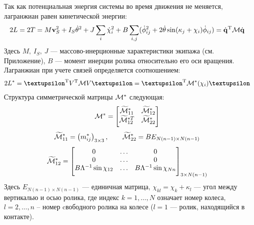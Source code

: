 Так как потенциальная энергия системы во время движения не меняется, лагранжиан  равен кинетической энергии:
\begin{equation}\label{kin_en}
    2L = 2T = M\boldsymbol{\mathbf{v}}_S^2 + I_S\dot{\theta}^2 + J\sum_i\dot{\chi}_i^2 + B\sum_{i,j}(\dot{\phi}_{ij}^2 + 2\dot{\theta}\sin(\kappa_j + \chi_i)\dot{\phi}_{ij})=\dot{\boldsymbol{\mathbf{q}}}^\mathrm{T}\mathcal{M}\dot{\boldsymbol{\mathbf{q}}}
\end{equation}
Здесь $M,\ I_S,\ J$ --- массово-инерционные характеристики экипажа (см. Приложение), $B$ --- момент инерции ролика относительно его оси вращения. Лагранжиан при учете связей определяется соотношением:
$$ 2L^{*}  = \vnu^\mathrm{T} V^\mathrm{T}\M V\vnu = \vnu^\mathrm{T} \M^*(\chi_i)\vnu $$
Структура симметрической матрицы $\mathcal{M}^*$ следующая:
$$
\M^* = 
    \begin{bmatrix}
        \widetilde{\M}^*_{11} & \widetilde{\M}^*_{12} \\
        \widetilde{\M}^{*T}_{12} & \widetilde{\M}^*_{22} \\[4pt]
    \end{bmatrix}
\vsp
$$
$$
\widetilde{\M}^*_{11} = 
    \left(
        m^*_{ij}
    \right)_{3\times3},
\qquad
\widetilde{\M}^*_{22} = 
    BE_{N(n-1) \times N(n-1)}
\vsp
$$
$$
\widetilde{\M}^*_{12} = 
    \begin{bmatrix}
        0&\ldots& 0 \\
        0&\ldots&0 \\
        B\Lambda^{-1}\sin\chi_{12}&\ldots& B\Lambda^{-1}\sin\chi_{Nn}\\[4pt]
    \end{bmatrix}_{3\times N(n-1)}
\vsp
$$
Здесь $E_{N(n-1) \times N(n-1)}$ --- единичная матрица, $\chi_{kl} = \chi_k+\kappa_l$ --- угол между вертикалью и осью ролика, где индекс $k = 1,\dots,N$ означает номер колеса, $l = 2,\ldots, n$ -- номер cвободного ролика на колесе ($l = 1$ --- ролик, находящийся в контакте).

